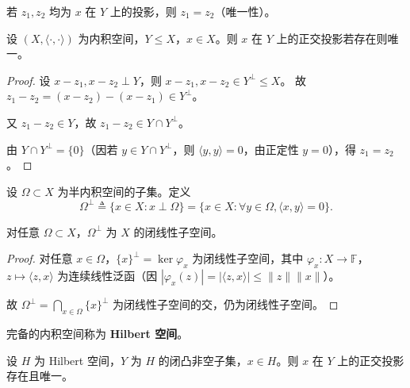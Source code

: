 \documentclass[lang=cn,a4paper,newtx,section]{elegantbook}
\begin{document}
\begin{remark}
  若 $z_1,z_2$ 均为 $x$ 在 $Y$ 上的投影，则 $z_1=z_2$（唯一性）。
\end{remark}

\begin{proposition}[正交投影的唯一性]\label{prop:orthogonal-projection-uniqueness}
  设 $(X,\langle\cdot,\cdot\rangle)$ 为内积空间，$Y\le X$，$x\in X$。则 $x$ 在 $Y$ 上的正交投影若存在则唯一。
\end{proposition}

\begin{proof}
  设 $x-z_1,x-z_2\perp Y$，则 $x-z_1,x-z_2\in Y^\perp\le X$。
  故 $z_1-z_2=(x-z_2)-(x-z_1)\in Y^\perp$。

  又 $z_1-z_2\in Y$，故 $z_1-z_2\in Y\cap Y^\perp$。

  由 $Y\cap Y^\perp=\{0\}$（因若 $y\in Y\cap Y^\perp$，则 $\langle y,y\rangle=0$，由正定性 $y=0$），得 $z_1=z_2$。
\end{proof}

\begin{definition}[正交补]
  设 $\Omega\subset X$ 为半内积空间的子集。定义
  \[
    \Omega^\perp \triangleq \{x\in X:x\perp\Omega\} = \{x\in X:\forall y\in\Omega,\langle x,y\rangle=0\}.
  \]
\end{definition}

\begin{proposition}\label{prop:orthogonal-complement-closed}
  对任意 $\Omega\subset X$，$\Omega^\perp$ 为 $X$ 的闭线性子空间。
\end{proposition}

\begin{proof}
  对任意 $x\in\Omega$，$\{x\}^\perp=\ker\varphi_x$ 为闭线性子空间，其中 $\varphi_x:X\to\mathbb{F}$，$z\mapsto\langle z,x\rangle$ 为连续线性泛函（因 $|\varphi_x(z)|=|\langle z,x\rangle|\le\|z\|\|x\|$）。

  故 $\Omega^\perp=\bigcap_{x\in\Omega}\{x\}^\perp$ 为闭线性子空间的交，仍为闭线性子空间。
\end{proof}

\begin{definition}[Hilbert 空间]
  完备的内积空间称为 \textbf{Hilbert 空间}。
\end{definition}

\begin{theorem}[正交投影存在性]\label{thm:orthogonal-projection-existence}
  设 $H$ 为 Hilbert 空间，$Y$ 为 $H$ 的闭凸非空子集，$x\in H$。则 $x$ 在 $Y$ 上的正交投影存在且唯一。
\end{theorem}
\end{document}
